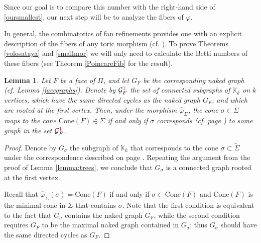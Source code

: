 \documentclass[11pt]{article}
\newtheorem{lemma}[theo]{Lemma}
\theoremstyle{definition}
\numberwithin{equation}{section}
\newcommand{\cone}{\mathrm{Cone}}
\newcommand{\tilS}{\widetilde{\Sigma}}
\begin{document}
Since our goal is to compare this number with the right-hand side of \eqref{oursmallest}, our next step will be to analyze the fibers of $\varphi$. 

In general, the combinatorics of fan refinements provides one with an explicit 
description of the fibers of any toric morphism (cf.  \cite{Yau}).
To prove Theorems \ref{volosataya} and \ref{smallmor} we will only need to 
calculate the Betti numbers of these fibers (see Theorem \ref{PoincareFib} for 
the 
result).



  																		


\begin{lemma}\label{fibergraphs} 
Let $F$ be a face of $\Pi$, and let $G_F$ be the corresponding naked graph (cf.  
Lemma \ref{facegraphs}).
Denote by $\mathcal{G}^{\textcolor{red}{1}}_F$  the set of connected  
subgraphs of $\mathbb{K}_k$ on $ k $ vertices, which have the same directed 
cycles as the naked 
graph $G_F$, and which are rooted at the first vertex. 
Then, under the morphism $\widehat{\varphi}_\Sigma$, the cone $\sigma\in\tilS$ 
maps to the cone $\cone(F)\in\Sigma$  if and only if $\sigma$ corresponds (cf.  
page \pageref{corresp}) to some graph in the set 
$\mathcal{G}^{\textcolor{red}{1}}_F$.
\end{lemma}
\begin{proof}
Denote by $G_\sigma$ the subgraph of $\mathbb{K}_k$ that corresponds to the cone $\sigma\subset \widetilde{\Sigma}$ under the correspondence described on page \pageref{corresp}. Repeating the argument from the proof of Lemma \ref{lemma:trees}, we conclude that $G_\sigma$ is a connected graph rooted at the first vertex. 

Recall that $\widehat{\varphi}_\Sigma(\sigma) = \cone(F)$ if and only if 
$\sigma \subset \cone(F)$
and $\cone(F)$ is the minimal cone in $\Sigma$ that contains $\sigma$.
Note that the first condition is equivalent to the fact that $G_\sigma$ contains the naked graph $G_F$, while the second condition requires $G_F$ to be the maximal naked graph contained in $G_\sigma$; thus $G_\sigma$ should have the same directed cycles as $G_F$. 
\end{proof}
\end{document}
